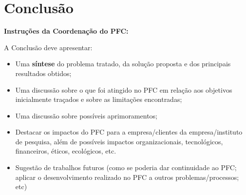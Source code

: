 \chapter{Conclusão}\label{cap:conclusao}

\textbf{Instruções da Coordenação do PFC:}

A Conclusão deve apresentar:
\begin{itemize}
	\item Uma \textbf{síntese} do problema tratado, da solução proposta e dos principais resultados obtidos;
	\item Uma discussão sobre o que foi atingido no PFC em relação aos objetivos inicialmente traçados e sobre as limitações encontradas;
	\item Uma discussão sobre possíveis aprimoramentos;
	\item Destacar os impactos do PFC para a empresa/clientes da empresa/instituto de pesquisa, além de possíveis impactos organizacionais, tecnológicos, financeiros, éticos, ecológicos, etc. 
	\item Sugestão de trabalhos futuros (como se poderia dar continuidade ao PFC; aplicar o desenvolvimento realizado no PFC a outros problemas/processos; etc)
\end{itemize}

